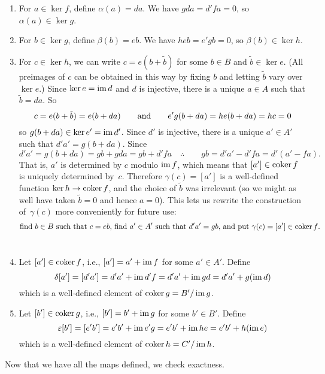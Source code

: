 \begin{enumerate}
\item For $a\in\ker f$, define $\alpha(a)=da$.  We have $gda=d'fa=0$, so $\alpha(a)\in\ker g$.
\\
\item For $b\in\ker g$, define $\beta(b)=eb$.  We have $heb=e'gb=0$, so $\beta(b)\in\ker h$.
\\
\item For $c\in\ker h$, we can write $c=e(b+\tilde{b})$ for some $b\in B$ and $\tilde{b}\in\ker e$.  (All preimages of $c$ can be obtained in this way by fixing $b$ and letting $\tilde{b}$ vary over $\ker e$.)  Since $\ker e=\operatorname{im} d$ and $d$ is injective, there is a unique $a\in A$ such that $\tilde{b}=da$.  So
\[c=e(b+\tilde{b})=e(b+da) \qquad\text{and}\qquad
e'g(b+da)=he(b+da)=hc=0\]
so $g(b+da)\in\ker e'=\operatorname{im} d'$.  Since $d'$ is injective,
there is a unique $a'\in A'$ such that $d'a'=g(b+da)$.  Since
\[d'a'=g(b+da)=gb+gda=gb+d'fa \quad\therefore\qquad
gb=d'a'-d'fa=d'(a'-fa).
\]
That is, $a'$ is determined by $c$ modulo $\operatorname{im} f$, which means that $[a']\in\operatorname{coker} f$ is uniquely determined by~$c$.  Therefore $\gamma(c)=[a']$ is a well-defined function $\ker h\to\operatorname{coker} f$, and the choice of $\tilde b$ was irrelevant (so we might as well have taken $\tilde b=0$ and hence $a=0$).  This lets us rewrite the construction of~$\gamma(c)$ more conveniently for future use:
\begin{equation} \label{construct-gamma}
\text{find $b\in B$ such that $c=eb$, find $a'\in A'$ such that $d'a'=gb$, and put $\gamma(c)=[a']\in\operatorname{coker} f$.}
\end{equation}
\\
\item Let $[a']\in\operatorname{coker} f$, i.e., $[a']=a'+\operatorname{im} f$ for some $a'\in A'$.  Define
\[\delta[a'] = [d'a']=d'a'+\operatorname{im} d'f=d'a'+\operatorname{im} gd=d'a'+g(\operatorname{im} d)\]
which is a well-defined element of $\operatorname{coker} g=B'/\operatorname{im} g$.
\\
\item Let $[b']\in\operatorname{coker} g$, i.e., $[b']=b'+\operatorname{im} g$ for some $b'\in B'$.  Define
\[\varepsilon[b'] = [e'b']=e'b'+\operatorname{im} e'g=e'b'+\operatorname{im} he=e'b'+h(\operatorname{im} e)\]
which is a well-defined element of $\operatorname{coker} h=C'/\operatorname{im} h$.
\end{enumerate}

Now that we have all the maps defined, we check exactness.

